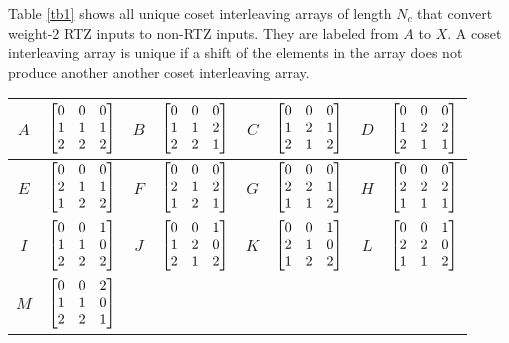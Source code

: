 \documentclass[11pt, oneside, dvipdfmx]{book}
\begin{document}
Table \ref{tb1} shows all unique coset interleaving arrays of length $N_c$ that convert weight-$2$ RTZ inputs to non-RTZ inputs. They are labeled from $A$ to $X$. A coset interleaving array is unique if a shift of the elements in the array does not produce another another coset interleaving array.

\begin{table}[h!]
\centering
\begin{tabular}{|c || c | c|| c|c || c | c|| c|} 
 \hline
 $A$ & $ \begin{bmatrix}0 & 0 & 0\cr1 & 1 & 1\cr2 & 2 & 2\end{bmatrix}$ 
 &
  $B$ & $\begin{bmatrix} 0 & 0 & 0 \cr 1 & 1 & 2 \cr 2 & 2 & 1\end{bmatrix}$ 
  &
  $C$ &$\begin{bmatrix} 0 & 0 & 0 \cr 1 & 2 & 1 \cr 2 & 1 & 2\end{bmatrix}$
  &
  $D$ & $\begin{bmatrix}0 & 0 & 0 \cr 1 & 2 & 2 \cr 2 & 1 & 1\end{bmatrix}$\\
 \hline
  $E$ & $\begin{bmatrix}0 & 0 & 0 \cr 2 & 1 & 1 \cr 1 & 2 & 2\end{bmatrix}$ 
 &
 $F$ & $\begin{bmatrix}0 & 0 & 0 \cr 2 & 1 & 2 \cr 1 & 2 & 1\end{bmatrix}$ 
 &
  $G$ & $\begin{bmatrix}0 & 0 & 0 \cr 2 & 2 & 1 \cr 1 & 1 & 2\end{bmatrix}$ 
 &
  $H$ & $\begin{bmatrix} 0 & 0 & 0\cr 2 & 2 & 2\cr 1 & 1 & 1\end{bmatrix}$\\ 
 \hline
   $I$ & $\begin{bmatrix} 0 & 0 & 1 \cr 1 & 1 & 0 \cr 2 & 2 & 2\end{bmatrix}$
 &
  $J$ & $\begin{bmatrix}0 & 0 & 1 \cr 1 & 2 & 0 \cr 2 & 1 & 2\end{bmatrix}$ 
 &
  $K$ & $\begin{bmatrix}0 & 0 & 1 \cr 2 & 1 & 0 \cr 1 & 2 & 2 \end{bmatrix}$
 &
 $L$ & $\begin{bmatrix}0 & 0 & 1 \cr 2 & 2 & 0 \cr 1 & 1 & 2\end{bmatrix}$\\ 
 \hline
 $M$ & $\begin{bmatrix}0 & 0 & 2 \cr 1 & 1 & 0 \cr 2 & 2 & 1 \end{bmatrix}$

\end{tabular}
\end{table}
\end{document}
